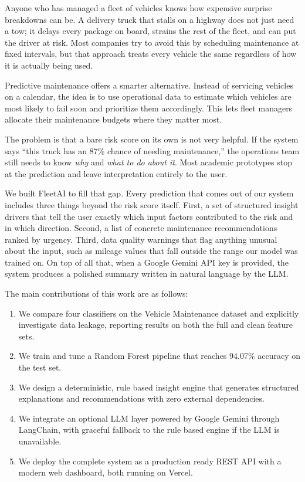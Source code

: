 \documentclass[conference]{IEEEtran}
\begin{document}
Anyone who has managed a fleet of vehicles knows how expensive surprise breakdowns can be. A delivery truck that stalls on a highway does not just need a tow; it delays every package on board, strains the rest of the fleet, and can put the driver at risk. Most companies try to avoid this by scheduling maintenance at fixed intervals, but that approach treats every vehicle the same regardless of how it is actually being used.

Predictive maintenance offers a smarter alternative. Instead of servicing vehicles on a calendar, the idea is to use operational data to estimate which vehicles are most likely to fail soon and prioritize them accordingly. This lets fleet managers allocate their maintenance budgets where they matter most.

The problem is that a bare risk score on its own is not very helpful. If the system says ``this truck has an 87\% chance of needing maintenance,'' the operations team still needs to know \textit{why} and \textit{what to do about it}. Most academic prototypes stop at the prediction and leave interpretation entirely to the user.

We built FleetAI to fill that gap. Every prediction that comes out of our system includes three things beyond the risk score itself. First, a set of structured insight drivers that tell the user exactly which input factors contributed to the risk and in which direction. Second, a list of concrete maintenance recommendations ranked by urgency. Third, data quality warnings that flag anything unusual about the input, such as mileage values that fall outside the range our model was trained on. On top of all that, when a Google Gemini API key is provided, the system produces a polished summary written in natural language by the LLM.

The main contributions of this work are as follows:

\begin{enumerate}
    \item We compare four classifiers on the Vehicle Maintenance dataset and explicitly investigate data leakage, reporting results on both the full and clean feature sets.
    \item We train and tune a Random Forest pipeline that reaches 94.07\% accuracy on the test set.
    \item We design a deterministic, rule based insight engine that generates structured explanations and recommendations with zero external dependencies.
    \item We integrate an optional LLM layer powered by Google Gemini through LangChain, with graceful fallback to the rule based engine if the LLM is unavailable.
    \item We deploy the complete system as a production ready REST API with a modern web dashboard, both running on Vercel.
\end{enumerate}
\end{document}

